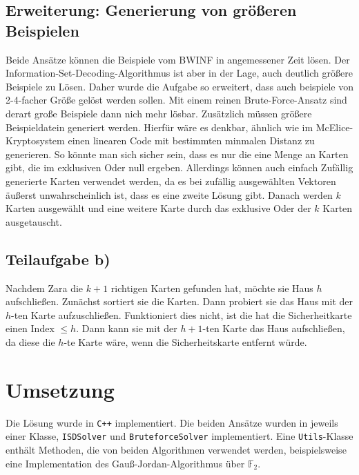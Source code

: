 \documentclass[a4paper,10pt,ngerman]{scrartcl}
\begin{document}
\subsection{Erweiterung: Generierung von größeren Beispielen}
Beide Ansätze können die Beispiele vom BWINF in angemessener Zeit lösen.
Der Information-Set-Decoding-Algorithmus ist aber in der Lage, auch deutlich größere Beispiele zu Lösen. Daher wurde die Aufgabe so erweitert, dass auch beispiele von 2-4-facher Größe gelöst werden sollen. Mit einem reinen Brute-Force-Ansatz sind derart große Beispiele dann nich mehr lösbar. Zusätzlich müssen größere Beispieldatein generiert werden.
Hierfür wäre es denkbar, ähnlich wie im McElice-Kryptosystem einen linearen Code mit bestimmten minmalen Distanz zu generieren. So könnte man sich sicher sein, dass es nur die eine Menge an Karten gibt, die im exklusiven Oder null ergeben. Allerdings können auch einfach Zufällig generierte Karten verwendet werden, da es bei zufällig ausgewählten Vektoren äußerst unwahrscheinlich ist, dass es eine zweite Lösung gibt. Danach werden $k$ Karten ausgewählt und eine weitere Karte durch das exklusive Oder der $k$ Karten ausgetauscht.
\subsection{Teilaufgabe b)}
Nachdem Zara die $k+1$ richtigen Karten gefunden hat, möchte sie Haus $h$ aufschließen. Zunächst sortiert sie die Karten. Dann probiert sie das Haus mit der $h$-ten Karte aufzuschließen. Funktioniert dies nicht, ist die hat die Sicherheitkarte einen Index $\leq h$. Dann kann sie mit der $h+1$-ten Karte das Haus aufschließen, da diese die $h$-te Karte wäre, wenn die Sicherheitskarte entfernt würde.
\section{Umsetzung}
Die Lösung wurde in \texttt{C++} implementiert. Die beiden Ansätze wurden in jeweils einer Klasse, \lstinline{ISDSolver} und \lstinline{BruteforceSolver} implementiert. Eine \lstinline{Utils}-Klasse enthält Methoden, die von beiden Algorithmen verwendet werden, beispielsweise eine Implementation des Gauß-Jordan-Algorithmus über $\mathbb{F}_2$.
\end{document}
